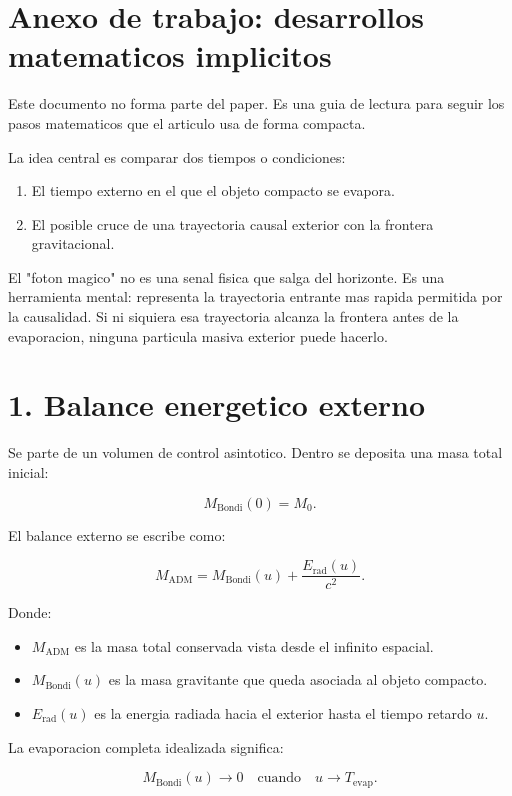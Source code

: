 ﻿\documentclass[11pt,a4paper]{article}
\begin{document}
\section*{Anexo de trabajo: desarrollos matematicos implicitos}

Este documento no forma parte del paper. Es una guia de lectura para seguir los pasos matematicos que el articulo usa de forma compacta.

La idea central es comparar dos tiempos o condiciones:

\begin{enumerate}
\item El tiempo externo en el que el objeto compacto se evapora.
\item El posible cruce de una trayectoria causal exterior con la frontera gravitacional.
\end{enumerate}

El "foton magico" no es una senal fisica que salga del horizonte. Es una herramienta mental: representa la trayectoria entrante mas rapida permitida por la causalidad. Si ni siquiera esa trayectoria alcanza la frontera antes de la evaporacion, ninguna particula masiva exterior puede hacerlo.

\section{1. Balance energetico externo}

Se parte de un volumen de control asintotico. Dentro se deposita una masa total inicial:

\[
M_{\mathrm{Bondi}}(0)=M_0.
\]

El balance externo se escribe como:

\[
M_{\mathrm{ADM}}
=
M_{\mathrm{Bondi}}(u)
+
\frac{E_{\mathrm{rad}}(u)}{c^2}.
\]

Donde:

\begin{itemize}
\item \(M_{\mathrm{ADM}}\) es la masa total conservada vista desde el infinito espacial.
\item \(M_{\mathrm{Bondi}}(u)\) es la masa gravitante que queda asociada al objeto compacto.
\item \(E_{\mathrm{rad}}(u)\) es la energia radiada hacia el exterior hasta el tiempo retardo \(u\).
\end{itemize}

La evaporacion completa idealizada significa:

\[
M_{\mathrm{Bondi}}(u)\to 0
\quad
\text{cuando}
\quad
u\to T_{\mathrm{evap}}.
\]
\end{document}
